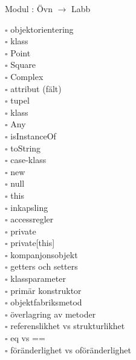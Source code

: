 
    Modul : Övn  $\rightarrow$ Labb 
    \begin{multicols}{3}\SlideFontTiny
    $\square$ objektorientering \\
$\square$ klass \\
$\square$ Point \\
$\square$ Square \\
$\square$ Complex \\
$\square$ attribut (fält) \\
$\square$ tupel \\
$\square$ klass \\
$\square$ Any \\
$\square$ isInstanceOf \\
$\square$ toString \\
$\square$ case-klass \\
$\square$ new \\
$\square$ null \\
$\square$ this \\
$\square$ inkapsling \\
$\square$ accessregler \\
$\square$ private \\
$\square$ private[this] \\
$\square$ kompanjonsobjekt \\
$\square$ getters och setters \\
$\square$ klassparameter \\
$\square$ primär konstruktor \\
$\square$ objektfabriksmetod \\
$\square$ överlagring av metoder \\
$\square$ referenslikhet vs strukturlikhet \\
$\square$ eq vs == \\
$\square$ föränderlighet vs oföränderlighet \\
    \end{multicols}
    